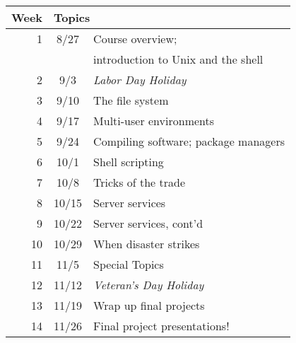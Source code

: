 \documentclass{article}
\begin{document}
\begin{multicols}{2}
\begin{center}
\begin{tabular}{r | c l}
	Week & \multicolumn{2}{|l}{Topics} \\
	\hline
	1 & 8/27 & Course overview; \\
    & & introduction to {\sc Unix} and the shell \\
	2 & 9/3 & \textit{Labor Day Holiday}\\
	3 & 9/10 & The file system \\
	4 & 9/17 & Multi-user environments \\
	5 & 9/24 & Compiling software; package managers \\
	6 & 10/1 & Shell scripting \\
	7 & 10/8 & Tricks of the trade \\
	8 & 10/15 & Server services \\
	9 & 10/22 & Server services, cont'd \\
	10 & 10/29 & When disaster strikes \\
	11 & 11/5 & Special Topics \\
	12 & 11/12 & \textit{Veteran's Day Holiday} \\
	13 & 11/19 & Wrap up final projects \\
	14 & 11/26 & Final project presentations! \\
\end{tabular}
\end{center}

\end{multicols}
\end{document}
